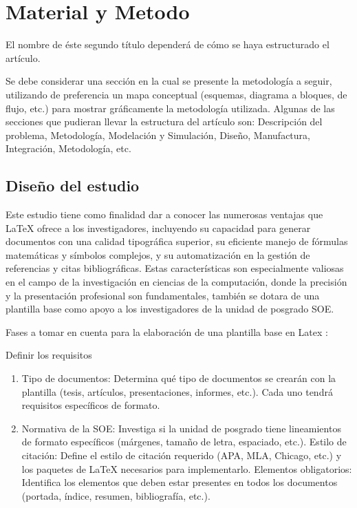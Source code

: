 \documentclass[10pt]{article}
\begin{document}
    \section{Material y Metodo}


    El nombre de éste segundo título dependerá de cómo se haya estructurado el artículo.
    
    Se debe considerar una sección en la cual se presente la metodología a seguir, utilizando de preferencia un mapa conceptual (esquemas, diagrama a bloques, de flujo, etc.) para mostrar gráficamente la metodología utilizada. Algunas de las secciones que pudieran llevar la estructura del artículo son: Descripción del problema, Metodología, Modelación y Simulación, Diseño, Manufactura, Integración, Metodología, etc.

    \subsection{Diseño del estudio}
    Este estudio tiene como finalidad dar a conocer las numerosas ventajas que LaTeX ofrece a los investigadores, incluyendo su capacidad para generar documentos con una calidad tipográfica superior, su eficiente manejo de fórmulas matemáticas y símbolos complejos, y su automatización en la gestión de referencias y citas bibliográficas. Estas características son especialmente valiosas en el campo de la investigación en ciencias de la computación, donde la precisión y la presentación profesional son fundamentales, también se dotara de una plantilla base como apoyo a los investigadores de la unidad de posgrado SOE.

    Fases a tomar en cuenta para la elaboración de una plantilla base en Latex :
    
    Definir los requisitos
    \begin{enumerate}
     
        \item Tipo de documentos: Determina qué tipo de documentos se crearán con la plantilla (tesis, artículos, presentaciones, informes, etc.). Cada uno tendrá requisitos específicos de formato.
        \item Normativa de la SOE: Investiga si la unidad de posgrado tiene lineamientos de formato específicos (márgenes, tamaño de letra, espaciado, etc.).
    Estilo de citación: Define el estilo de citación requerido (APA, MLA, Chicago, etc.) y los paquetes de LaTeX necesarios para implementarlo.
    Elementos obligatorios: Identifica los elementos que deben estar presentes en todos los documentos (portada, índice, resumen, bibliografía, etc.).
    \end{enumerate}
    
\end{document}
